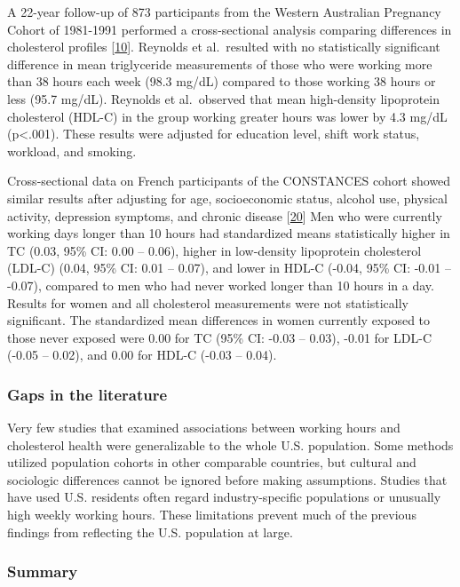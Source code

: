 \documentclass[]{elsarticle} %
\begin{document}
A 22-year follow-up of 873 participants from the Western Australian
Pregnancy Cohort of 1981-1991 performed a cross-sectional analysis
comparing differences in cholesterol profiles
{[}\protect\hyperlink{ref-reynolds2018}{10}{]}. Reynolds et al.~resulted
with no statistically significant difference in mean triglyceride
measurements of those who were working more than 38 hours each week
(98.3 mg/dL) compared to those working 38 hours or less (95.7 mg/dL).
Reynolds et al.~observed that mean high-density lipoprotein cholesterol
(HDL-C) in the group working greater hours was lower by 4.3 mg/dL
(p\textless.001). These results were adjusted for education level, shift
work status, workload, and smoking.

Cross-sectional data on French participants of the CONSTANCES cohort
showed similar results after adjusting for age, socioeconomic status,
alcohol use, physical activity, depression symptoms, and chronic disease
{[}\protect\hyperlink{ref-virtanen2019}{20}{]} Men who were currently
working days longer than 10 hours had standardized means statistically
higher in TC (0.03, 95\% CI: 0.00 -- 0.06), higher in low-density
lipoprotein cholesterol (LDL-C) (0.04, 95\% CI: 0.01 -- 0.07), and lower
in HDL-C (-0.04, 95\% CI: -0.01 -- -0.07), compared to men who had never
worked longer than 10 hours in a day. Results for women and all
cholesterol measurements were not statistically significant. The
standardized mean differences in women currently exposed to those never
exposed were 0.00 for TC (95\% CI: -0.03 -- 0.03), -0.01 for LDL-C
(-0.05 -- 0.02), and 0.00 for HDL-C (-0.03 -- 0.04).

\hypertarget{gaps-in-the-literature}{%
\subsubsection{Gaps in the literature}\label{gaps-in-the-literature}}

Very few studies that examined associations between working hours and
cholesterol health were generalizable to the whole U.S. population. Some
methods utilized population cohorts in other comparable countries, but
cultural and sociologic differences cannot be ignored before making
assumptions. Studies that have used U.S. residents often regard
industry-specific populations or unusually high weekly working hours.
These limitations prevent much of the previous findings from reflecting
the U.S. population at large.

\hypertarget{summary}{%
\subsubsection{Summary}\label{summary}}
\end{document}
